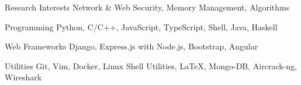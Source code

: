 


\begin{cvskills}

  \cvskill
  {Research Interests}
  {Network \& Web Security, Memory Management, Algorithms}  
  
  \cvskill
  {Programming}
  {Python, C/C++, JavaScript, TypeScript, Shell, Java, Haskell}


  \cvskill
  {Web Frameworks}
  {Django, Express.js with Node.js, Bootstrap, Angular}

  \cvskill
  {Utilities}
  {Git, Vim, Docker, Linux Shell Utilities, \LaTeX, Mongo-DB, Aircrack-ng, Wireshark}


\end{cvskills}


